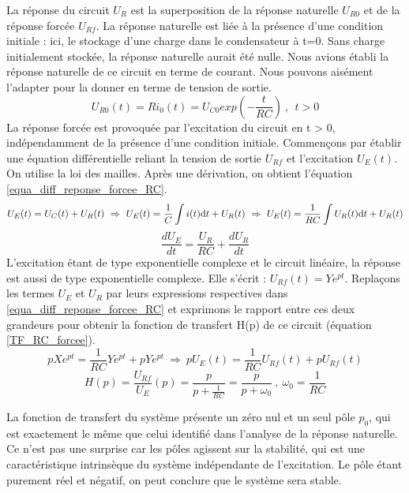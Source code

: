 	La réponse du circuit $U_{R}$ est la superposition de la réponse naturelle $U_{R0}$ et de la réponse forcée $U_{Rf}$. La réponse naturelle est liée à la présence d'une condition initiale : ici, le stockage d'une charge dans le condensateur à t=0. Sans charge initialement stockée, la réponse naturelle aurait été nulle. Nous avions établi la réponse naturelle de ce circuit en terme de courant. Nous pouvons aisément l'adapter pour la donner en terme de tension de sortie.
	\begin{equation*}\label{}
	U_{R0}(t)=Ri_{0}(t)=U_{C0}exp(-\frac{t}{RC})~,~~t>0
	\end{equation*}
	La réponse forcée est provoquée par l'excitation du circuit en t > 0, indépendamment de la présence d'une condition initiale. Commençons par établir une équation différentielle reliant la tension de sortie $U_{Rf}$ et l'excitation $U_{E}(t)$. On utilise la loi des mailles. Après une dérivation, on obtient l'équation \ref{equa_diff_reponse_forcee_RC}.
	\begin{equation*}\label{}
	U_{E}(t)=U_{C}(t)+U_{R}(t) ~ \Rightarrow ~ U_{E}(t)=\frac{1}{C}\int i(t) \mathrm{d{}} t+U_{R}(t)~ \Rightarrow ~U_{E}(t)=\frac{1}{RC}\int U_{R}(t) \mathrm{d{}} t+U_{R}(t)
	\end{equation*} 
	\begin{equation}\label{equa_diff_reponse_forcee_RC}
	\frac{dU_{E}}{dt}=\frac{U_{R}}{RC}+\frac{dU_{R}}{dt}
	\end{equation}
	L'excitation étant de type exponentielle complexe et le circuit linéaire, la réponse est aussi de type exponentielle complexe. Elle s'écrit : $U_{Rf}(t)=Ye^{pt}$. Replaçons les termes $U_{E}$ et $U_{R}$ par leurs expressions respectives dans \ref{equa_diff_reponse_forcee_RC} et exprimons le rapport entre ces deux grandeurs pour obtenir la fonction de transfert H(p) de ce circuit (équation \ref{TF_RC_forcee}).
	\begin{equation*}
	pXe^{pt}=\frac{1}{RC} Ye^{pt}+pYe^{pt} ~\Rightarrow~pU_{E}(t)=\frac{1}{RC}U_{Rf}(t)+pU_{Rf}(t)
	\end{equation*}
	\begin{equation}\label{TF_RC_forcee}
	H(p)=\frac{U_{Rf}}{U_{E}}(p)=\frac{p}{p+\frac{1}{RC}}=\frac{p}{p+\omega_{0}}~,~\omega_{0}=\frac{1}{RC}
	\end{equation}

	La fonction de transfert du système présente un zéro nul et un seul pôle $p_{0}$, qui est exactement le même que celui identifié dans l'analyse de la réponse naturelle. Ce n'est pas une surprise car les pôles agissent sur la stabilité, qui est une caractéristique intrinsèque du système indépendante de l'excitation. Le pôle étant purement réel et négatif, on peut conclure que le système sera stable.
		
